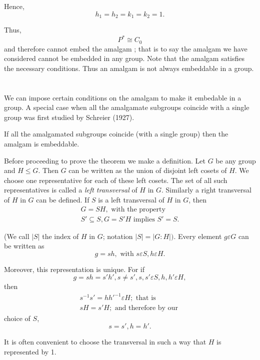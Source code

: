 Hence,
$$
h_1 = h_2 = k_1 = k_2 =1.
$$

Thus,
$$
P^* \cong C_0
$$
and therefore cannot embed the amalgam ; that is to say the amalgam we
have considered cannot be embedded in any group. Note that the amalgam
satisfies the necessary conditions. Thus an amalgam is not always
embeddable in a group.  

\section{}%

We can impose certain conditions on the amalgam to make it embedable
in a group. A special case when all the amalgamate subgroups coincide
with a single group was first studied by Schreier (1927). 

\begin{Theorem}[Schreier, $1927$]%
  If all the amalgamated subgroups coincide (with a single group) then
  the amalgam is embeddable. 
\end{Theorem}

Before proceeding to prove the theorem we make a definition. Let $G$
be any group and $H \leq G$. Then $G$ can be written as the union of
disjoint left cosets of $H$. We choose one representative for each of
these left cosets. The set of all such representatives is called a
\textit{ left transversal } of $H$ in $G$. Similarly a right
transversal of $H$ in $G$ can be defined. If $S$ is a left transversal
of $H$ in $G$, then  
\begin{gather*}
  G= SH, \text{ with the property }\\
  S' \subseteq S, G = S' H \text{ implies } S' = S.
\end{gather*}

(We call $|S|$ the index of $H$ in $G$; notation $|S| =|G :
H|)$. Every element $g \varepsilon G$ can be written as  
$$
g = sh, \text{ with } s \varepsilon S, h \varepsilon H.
$$

Moreover, this representation is unique. For if 
$$
g= sh = s'h', s \neq s', s,s' \varepsilon S, h, h' \varepsilon H,
$$
then 
\begin{gather*}
  s^{-1}s' = hh'^{-1} \varepsilon H; \text{ that is }\\
  sH= s'H; \text{ and therefore by our }
\end{gather*}
choice of $S$,
$$
s = s', h = h'.
$$

It is often convenient to choose the transversal in such a way that
$H$ is represented by 1. 

